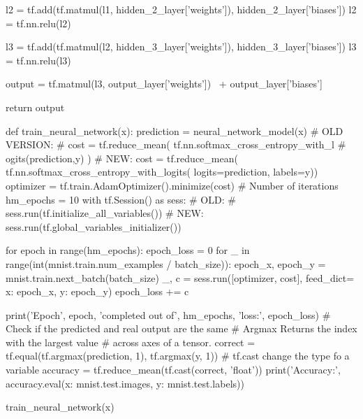 \documentclass[11pt]{article}
\begin{document}
\begin{python}
    l2 = tf.add(tf.matmul(l1, hidden_2_layer['weights']),
                hidden_2_layer['biases'])
    l2 = tf.nn.relu(l2)

    l3 = tf.add(tf.matmul(l2, hidden_3_layer['weights']),
                hidden_3_layer['biases'])
    l3 = tf.nn.relu(l3)

    output = tf.matmul(l3, output_layer['weights']) \
             + output_layer['biases']

    return output


def train_neural_network(x):
    prediction = neural_network_model(x)
    # OLD VERSION:
    # cost = tf.reduce_mean( tf.nn.softmax_cross_entropy_with_l
    # ogits(prediction,y) )
    # NEW:
    cost = tf.reduce_mean(
        tf.nn.softmax_cross_entropy_with_logits(
            logits=prediction, labels=y))
    optimizer = tf.train.AdamOptimizer().minimize(cost)
    # Number of iterations
    hm_epochs = 10
    with tf.Session() as sess:
        # OLD:
        # sess.run(tf.initialize_all_variables())
        # NEW:
        sess.run(tf.global_variables_initializer())

        for epoch in range(hm_epochs):
            epoch_loss = 0
            for _ in range(int(mnist.train.num_examples / batch_size)):
                epoch_x, epoch_y = mnist.train.next_batch(batch_size)
                _, c = sess.run([optimizer, cost], feed_dict={
                    x: epoch_x, y: epoch_y})
                epoch_loss += c

            print('Epoch', epoch, 'completed out of',
                  hm_epochs, 'loss:', epoch_loss)
        # Check if the predicted and real output are the same
        # Argmax Returns the index with the largest value
        # across axes of a tensor.
        correct = tf.equal(tf.argmax(prediction, 1),
                           tf.argmax(y, 1))
        # tf.cast change the type fo a variable
        accuracy = tf.reduce_mean(tf.cast(correct, 'float'))
        print('Accuracy:', accuracy.eval({x: mnist.test.images,
                                          y: mnist.test.labels}))


train_neural_network(x)
\end{python}{}
\clearpage
\end{document}
